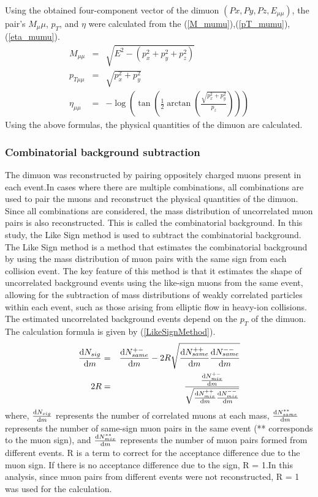                 Using the obtained four-component vector of the dimuon $(Px, Py, Pz, E_{\mu\mu})$, the pair's $M_\mu\mu$, $p_T$, and $\eta$ were calculated from the (\ref{M_mumu}),(\ref{pT_mumu}),(\ref{eta_mumu}).
                \begin{eqnarray}
                    M_{\mu\mu} &=& \sqrt{E^2 - (p_x^2 + p_y^2 + p_z^2)}\\ \label{M_mumu}
                    p_{T\mu\mu} &=& \sqrt{p_x^2 + p_y^2}\\ \label{pT_mumu}
                    \eta_{\mu\mu} &=& -\log\left(\tan\left(\frac{1}{2}\arctan\left(\frac{\sqrt{p_x^2 + p_y^2}}{p_z}\right)\right)\right) \label{eta_mumu}
                \end{eqnarray}
                Using the above formulas, the physical quantities of the dimuon are calculated.
                
            \subsubsection{Combinatorial background subtraction}
            \label{Analysis:Dimuon:Combinatorial BG subtraction}
                The dimuon was reconstructed by pairing oppositely charged muons present in each event.In cases where there are multiple combinations, all combinations are used to pair the muons and reconstruct the physical quantities of the dimuon. Since all combinations are considered, the mass distribution of uncorrelated muon pairs is also reconstructed. This is called the combinatorial background. In this study, the Like Sign method is used to subtract the combinatorial background. The Like Sign method is a method that estimates the combinatorial background by using the mass distribution of muon pairs with the same sign from each collision event. The key feature of this method is that it estimates the shape of uncorrelated background events using the like-sign muons from the same event, allowing for the subtraction of mass distributions of weakly correlated particles within each event, such as those arising from elliptic flow in heavy-ion collisions. The estimated uncorrelated background events depend on the $p_T$ of the dimuon.
                The calculation formula is given by (\ref{LikeSignMethod}).
                \begin{eqnarray}
                    \label{LikeSignMethod}
                    \dv{N_{sig}}{m} &=& \dv{N_{same}^{+-}}{m} - 2R \sqrt{\dv{N_{same}^{++}}{m} \dv{N_{same}^{--}}{m}}\\
                    2R &=& \frac{\dv{N_{mix}^{+-}}{m}}{\sqrt{\dv{N_{mix}^{++}}{m} \dv{N_{mix}^{--}}{m}}} 
                \end{eqnarray}
                where, $\dv{N_{sig}}{m}$ represents the number of correlated muons at each mass, $\dv{N_{same}^{**}}{m}$ represents the number of same-sign muon pairs in the same event (** corresponds to the muon sign), and $\dv{N_{mix}^{**}}{m}$ represents the number of muon pairs formed from different events. R is a term to correct for the acceptance difference due to the muon sign. If there is no acceptance difference due to the sign, R = 1.\@ In this analysis, since muon pairs from different events were not reconstructed, R = 1 was used for the calculation.

